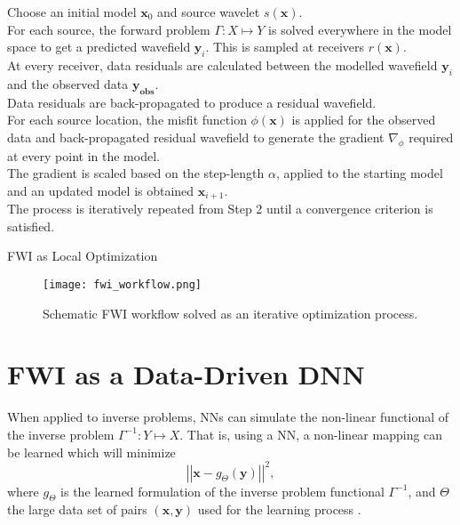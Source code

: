 \begin{algorithm}
Choose an initial model $\boldsymbol{x}_0$ and source wavelet $s(\boldsymbol{x})$.\\
For each source, the forward problem $\Gamma:X\mapsto Y$ is solved everywhere in the model space to get a predicted wavefield $\boldsymbol{y}_i$. This is sampled at receivers $r(\boldsymbol{x})$.\\
At every receiver, data residuals are calculated between the modelled wavefield $\boldsymbol{y}_i$ and the observed data $\boldsymbol{y}_{\boldsymbol{obs}}$.\\
Data residuals are back-propagated to produce a residual wavefield.\\
For each source location, the misfit function $\phi(\boldsymbol{x})$ is applied for the observed data and back-propagated residual wavefield to generate the gradient $\nabla_\phi$ required at every point in the model.\\
The gradient is scaled based on the step-length $\alpha$, applied to the starting model and an updated model is obtained $\boldsymbol{x}_{i+1}$.\\
The process is iteratively repeated from Step 2 until a convergence criterion is satisfied.
\caption{FWI as Local Optimization}
\label{algo:fwi_local_optimization}
\end{algorithm}

\begin{figure}[ht]
	\centering
	\texttt{[image: fwi\_workflow.png]}
	\caption[Schematic FWI workflow solved as an iterative optimization process.]{Schematic FWI workflow solved as an iterative optimization process.}
	\label{fig:workflow_FWI}
\end{figure}

\section[FWI as a Data-Driven DNN]{FWI as a Data-Driven DNN}\label{sec:theory_FWI_as_Learned_Direct_Approx}
When applied to inverse problems, \acp{NN} can simulate the non-linear functional of the inverse problem $\Gamma^{-1}:Y\mapsto X$. That is, using a NN, a non-linear mapping can be learned which will minimize
\begin{equation}
	\left|\left|\boldsymbol{x}-g_\Theta(\boldsymbol{y})\right|\right|^2,
\end{equation}
where $g_\Theta$ is the learned formulation of the inverse problem functional $\Gamma^{-1}$, and $\Theta$ the large data set of pairs $(\boldsymbol{x},\boldsymbol{y})$ used for the learning process \citep{Lucas2018}.

